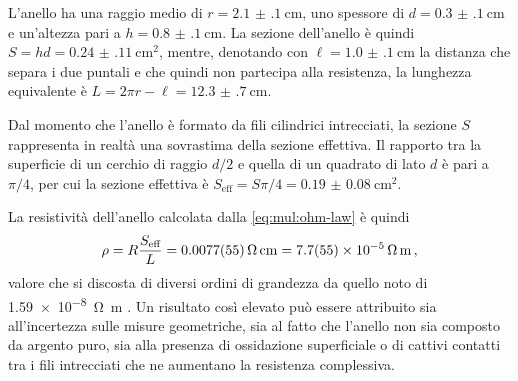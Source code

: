             L'anello ha una raggio medio di $r = \SI{2.1(1)}{\centi\meter}$, uno spessore di $d = \SI{0.3(1)}{\centi\meter}$ e un'altezza pari a $h = \SI{0.8(1)}{\centi\meter}$. La sezione dell'anello è quindi $S = hd = \SI{0.24(11)}{\centi\meter\squared}$, mentre, denotando con $\ell = \SI{1.0(1)}{\centi\meter}$ la distanza che separa i due puntali e che quindi non partecipa alla resistenza, la lunghezza equivalente è $L = 2\pi r - \ell = \SI{12.3(7)}{\centi\meter}$.

            Dal momento che l'anello è formato da fili cilindrici intrecciati, la sezione $S$ rappresenta in realtà una sovrastima della sezione effettiva. Il rapporto tra la superficie di un cerchio di raggio $d/2$ e quella di un quadrato di lato $d$ è pari a $\pi / 4$, per cui la sezione effettiva è $S_\text{eff} = S \pi / \num{4} = \SI{0.19(8)}{\centi\meter\squared}$.
            
            La resistività dell'anello calcolata dalla \eqref{eq:mul:ohm-law} è quindi
            \begin{equation*}
                \rho = R\frac{S_\text{eff}}{L} = \SI{0.0077(55)}{\ohm\centi\meter} = \SI{7.7(55)e-5}{\ohm\meter}
                \mycomma
            \end{equation*}
            valore che si discosta di diversi ordini di grandezza da quello noto di \SI{1.59e-8}{\ohm\meter} \cite{Griffiths2012-qz}. Un risultato così elevato può essere attribuito sia all'incertezza sulle misure geometriche, sia al fatto che l'anello non sia composto da argento puro, sia alla presenza di ossidazione superficiale o di cattivi contatti tra i fili intrecciati che ne aumentano la resistenza complessiva.
            


